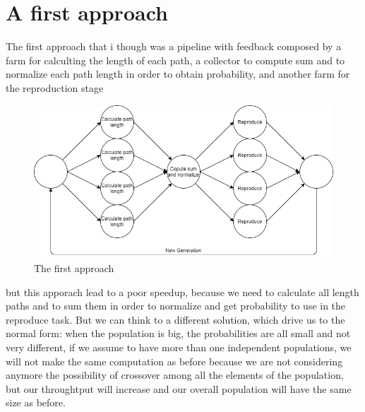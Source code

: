 \documentclass{article}
\begin{document}
    \section{A first approach}\label{sec:s2}
	The first approach that i though was a pipeline with feedback composed by a farm for calculting the length of each path, a collector to compute sum and to normalize
	each path length in order to obtain probability, and another farm for the reproduction stage
    \begin{figure}
        \includegraphics[width=\linewidth]{img/first.png}
        \caption{The first approach}
        \label{fig:first}
    \end{figure}
    but this apporach lead to a poor speedup, because we need to calculate all length paths and to sum them in order to normalize and get probability to use in the reproduce task. But we can think to a different solution, which drive us to the normal form: when the population is big, the probabilities are all small and not very different, if we assume to have more than one independent populations, we will not make the same computation as before because we are not considering anymore the possibility of crossover among all the elements of the population, but our throughtput will increase and our overall population will have the same size as before.
\end{document}
